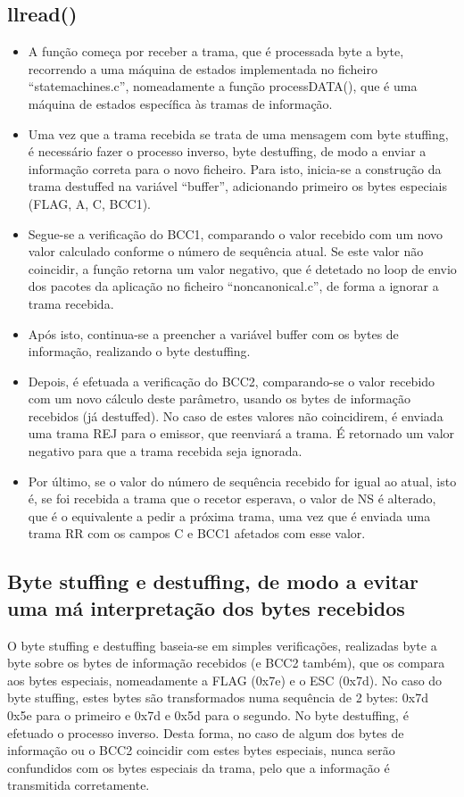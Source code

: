 \documentclass[article, a4paper, 11pt, oneside]{memoir}
\begin{document}
\subsection{llread()}
\begin{itemize}
  	\item A função começa por receber a trama, que é processada byte a byte, recorrendo a uma máquina de estados implementada no ficheiro “statemachines.c”, nomeadamente a função processDATA(), que é uma máquina de estados específica às tramas de informação.
  	\item Uma vez que a trama recebida se trata de uma mensagem com byte stuffing, é necessário fazer o processo inverso, byte destuffing, de modo a enviar a informação correta para o novo ficheiro. Para isto, inicia-se a construção da trama destuffed na variável “buffer”, adicionando primeiro os bytes especiais (FLAG, A, C, BCC1).
  	\item Segue-se a verificação do BCC1, comparando o valor recebido com um novo valor calculado conforme o número de sequência atual. Se este valor não coincidir, a função retorna um valor negativo, que é detetado no loop de envio dos pacotes da aplicação no ficheiro “noncanonical.c”, de forma a ignorar a trama recebida.
  	\item Após isto, continua-se a preencher a variável buffer com os bytes de informação, realizando o byte destuffing.
  	\item Depois, é efetuada a verificação do BCC2, comparando-se o valor recebido com um novo cálculo deste parâmetro, usando os bytes de informação recebidos (já destuffed). No caso de estes valores não coincidirem, é enviada uma trama REJ para o emissor, que reenviará a trama. É retornado um valor negativo para que a trama recebida seja ignorada.
  	\item Por último, se o valor do número de sequência recebido for igual ao atual, isto é, se foi recebida a trama que o recetor esperava, o valor de NS é alterado, que é o equivalente a pedir a próxima trama, uma vez que é enviada uma trama RR com os campos C e BCC1 afetados com esse valor.

\end{itemize}

\subsection{Byte stuffing e destuffing, de modo a evitar uma má interpretação dos bytes recebidos}
O byte stuffing e destuffing baseia-se em simples verificações, realizadas byte a byte sobre os bytes de informação recebidos (e BCC2 também), 
que os compara aos bytes especiais, nomeadamente a FLAG (0x7e) e o ESC (0x7d). 
No caso do byte stuffing, estes bytes são transformados numa sequência de 2 bytes: 0x7d 0x5e para o primeiro e 0x7d e 0x5d para o segundo. 
No byte destuffing, é efetuado o processo inverso.
Desta forma, no caso de algum dos bytes de informação ou o BCC2 coincidir com estes bytes especiais, nunca serão confundidos com os bytes especiais da trama, 
pelo que a informação é transmitida corretamente.
\end{document}
